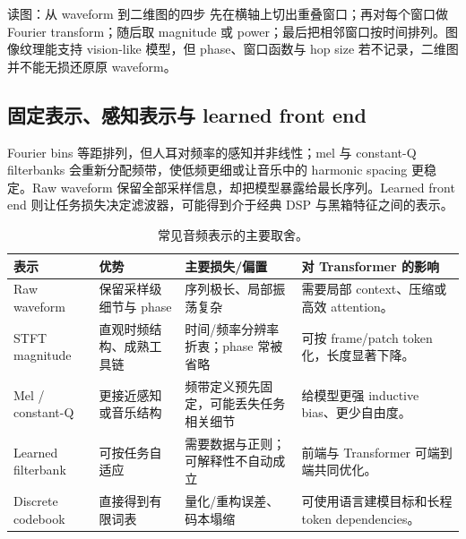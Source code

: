 \begin{knowledgebox}{读图：从 waveform 到二维图的四步}
先在横轴上切出重叠窗口；再对每个窗口做 Fourier transform；随后取 magnitude 或 power；最后把相邻窗口按时间排列。图像纹理能支持 vision-like 模型，但 phase、窗口函数与 hop size 若不记录，二维图并不能无损还原原 waveform。
\end{knowledgebox}


\subsection{固定表示、感知表示与 learned front end}

Fourier bins 等距排列，但人耳对频率的感知并非线性；mel 与 constant-Q filterbanks 会重新分配频带，使低频更细或让音乐中的 harmonic spacing 更稳定。Raw waveform 保留全部采样信息，却把模型暴露给最长序列。Learned front end 则让任务损失决定滤波器，可能得到介于经典 DSP 与黑箱特征之间的表示。


\begin{table}[H]
\centering
\small
\caption{常见音频表示的主要取舍。}
\begin{tabularx}{\textwidth}{L{0.19\textwidth}L{0.22\textwidth}L{0.22\textwidth}X}
\toprule
表示 & 优势 & 主要损失/偏置 & 对 Transformer 的影响 \\
\midrule
Raw waveform & 保留采样级细节与 phase & 序列极长、局部振荡复杂 & 需要局部 context、压缩或高效 attention。 \\
STFT magnitude & 直观时频结构、成熟工具链 & 时间/频率分辨率折衷；phase 常被省略 & 可按 frame/patch token 化，长度显著下降。 \\
Mel / constant-Q & 更接近感知或音乐结构 & 频带定义预先固定，可能丢失任务相关细节 & 给模型更强 inductive bias、更少自由度。 \\
Learned filterbank & 可按任务自适应 & 需要数据与正则；可解释性不自动成立 & 前端与 Transformer 可端到端共同优化。 \\
Discrete codebook & 直接得到有限词表 & 量化/重构误差、码本塌缩 & 可使用语言建模目标和长程 token dependencies。 \\
\bottomrule
\end{tabularx}
\end{table}

